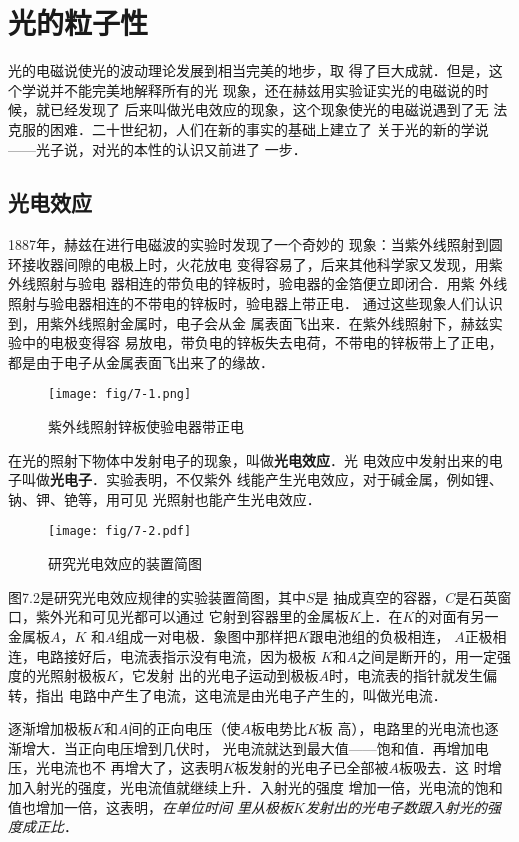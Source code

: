 \chapter{光的粒子性}
光的电磁说使光的波动理论发展到相当完美的地步，取
得了巨大成就．但是，这个学说并不能完美地解释所有的光
现象，还在赫兹用实验证实光的电磁说的时候，就已经发现了
后来叫做光电效应的现象，这个现象使光的电磁说遇到了无
法克服的困难．二十世纪初，人们在新的事实的基础上建立了
关于光的新的学说——光子说，对光的本性的认识又前进了
一步．


\section{光电效应}
1887年，赫兹在进行电磁波的实验时发现了一个奇妙的
现象：当紫外线照射到圆环接收器间隙的电极上时，火花放电
变得容易了，后来其他科学家又发现，用紫外线照射与验电
器相连的带负电的锌板时，验电器的金箔便立即闭合．用紫
外线照射与验电器相连的不带电的锌板时，验电器上带正电．
通过这些现象人们认识到，用紫外线照射金属时，电子会从金
属表面飞出来．在紫外线照射下，赫兹实验中的电极变得容
易放电，带负电的锌板失去电荷，不带电的锌板带上了正电，
都是由于电子从金属表面飞出来了的缘故．
\begin{figure}[htp]\centering
    \texttt{[image: fig/7-1.png]}
    \caption{紫外线照射锌板使验电器带正电}
    \end{figure}

在光的照射下物体中发射电子的现象，叫做\textbf{光电效应}．光
电效应中发射出来的电子叫做\textbf{光电子}．实验表明，不仅紫外
线能产生光电效应，对于碱金属，例如锂、钠、钾、铯等，用可见
光照射也能产生光电效应．
\begin{figure}[htp]\centering
    \texttt{[image: fig/7-2.pdf]}
    \caption{研究光电效应的装置简图}
    \end{figure}

图7.2是研究光电效应规律的实验装置简图，其中$S$是
抽成真空的容器，$C$是石英窗口，紫外光和可见光都可以通过
它射到容器里的金属板$K$上．在$K$的对面有另一金属板$A$，$K$
和$A$组成一对电极．象图中那样把$K$跟电池组的负极相连，
$A$正极相连，电路接好后，电流表指示没有电流，因为极板
$K$和$A$之间是断开的，用一定强度的光照射极板$K$，它发射
出的光电子运动到极板$A$时，电流表的指针就发生偏转，指出
电路中产生了电流，这电流是由光电子产生的，叫做光电流．

逐渐增加极板$K$和$A$间的正向电压（使$A$板电势比$K$板
高），电路里的光电流也逐渐增大．当正向电压增到几伏时，
光电流就达到最大值——饱和值．再增加电压，光电流也不
再增大了，这表明$K$板发射的光电子已全部被$A$板吸去．这
时增加入射光的强度，光电流值就继续上升．入射光的强度
增加一倍，光电流的饱和值也增加一倍，这表明，\textit{在单位时间
里从极板$K$发射出的光电子数跟入射光的强度成正比}．

